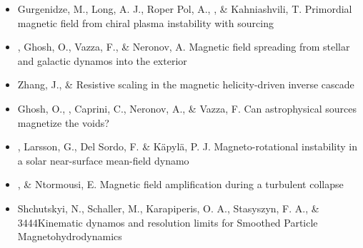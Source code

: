 \begin{itemize}
\item[{475.}~]
Gurgenidze, M., Long, A. J., Roper Pol, A., \Brandenburg, \& Kahniashvili, T.
{Primordial magnetic field from chiral plasma instability with sourcing}

\item[{474.}~]
\Brandenburg, Ghosh, O., Vazza, F., \& Neronov, A.
{Magnetic field spreading from stellar and galactic dynamos into the exterior}

\item[{473.}~]
Zhang, J., \& \Brandenburg{}
{Resistive scaling in the magnetic helicity-driven inverse cascade}

\item[{472.}~]
Ghosh, O., \Brandenburg, Caprini, C., Neronov, A., \& Vazza, F.
{Can astrophysical sources magnetize the voids?}

\item[{471.}~]
\Brandenburg, Larsson, G., Del Sordo, F. \& K\"apyl\"a, P. J.
{Magneto-rotational instability in a solar near-surface mean-field dynamo}

\item[{470.}~]
\Brandenburg, \& Ntormousi, E.
{Magnetic field amplification during a turbulent collapse}

\item[{469.}~]
Shchutskyi, N., Schaller, M., Karapiperis, O. A., Stasyszyn, F. A., \& \Brandenburg{}
{3444}{Kinematic dynamos and resolution limits for Smoothed Particle Magnetohydrodynamics}


\end{itemize}
